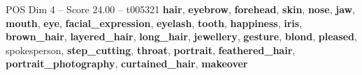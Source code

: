 \begin{textsample}{POS Dim 4 – Score 24.00 – t005321}  \label{ex:f4_pos_011}
\textbf{hair}, \textbf{eyebrow}, \textbf{forehead}, \textbf{skin}, \textbf{nose}, \textbf{jaw}, \textbf{mouth}, \textbf{eye}, \textbf{facial\_expression}, \textbf{eyelash}, \textbf{tooth}, \textbf{happiness}, \textbf{iris}, \textbf{brown\_hair}, \textbf{layered\_hair}, \textbf{long\_hair}, \textbf{jewellery}, \textbf{gesture}, \textbf{blond}, \textbf{pleased}, spokesperson, \textbf{step\_cutting}, \textbf{throat}, \textbf{portrait}, \textbf{feathered\_hair}, \textbf{portrait\_photography}, \textbf{curtained\_hair}, \textbf{makeover}

\end{textsample}
